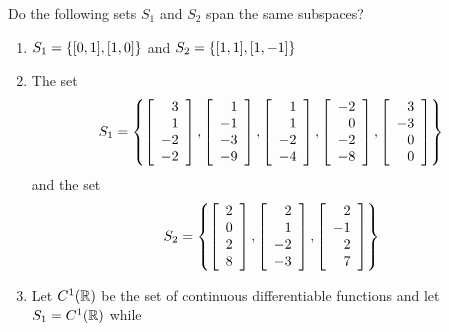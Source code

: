 \documentclass{tutorial}
\begin{document}
\begin{prob}[Span]
Do the following sets $S_1$ and $S_2$ span the same subspaces?
\begin{enumerate}[label=(\alph*)]
\item $S_1 = \left\{ [0,1], [1,0] \right\}$ and $S_2 = \left\{ [1,1], [1,-1] \right\}$
\item The set
\[
  S_1 = \left\{
    \left[ \begin{array}{r}  3 \\    1 \\   -2 \\   -2 \end{array} \right],
    \left[ \begin{array}{r}  1 \\   -1 \\   -3 \\   -9 \end{array} \right],
    \left[ \begin{array}{r}  1 \\    1 \\   -2 \\   -4 \end{array} \right],
    \left[ \begin{array}{r} -2 \\    0 \\   -2 \\   -8 \end{array} \right],
    \left[ \begin{array}{r}  3 \\   -3 \\    0 \\    0 \end{array} \right]
  \right\}
\]
and the set
\[
  S_2 = \left\{
    \left[ \begin{array}{r} 2 \\    0 \\    2 \\    8 \end{array} \right],
    \left[ \begin{array}{r} 2 \\    1 \\   -2 \\   -3 \end{array} \right],
    \left[ \begin{array}{r} 2 \\   -1 \\    2 \\    7 \end{array} \right]
  \right\}
\]
\item Let $C^1 (\mathbb{R})$ be the set of continuous differentiable functions and let $S_1 = C^1 (\mathbb{R})$ while

\end{enumerate}
\end{prob}
\end{document}
